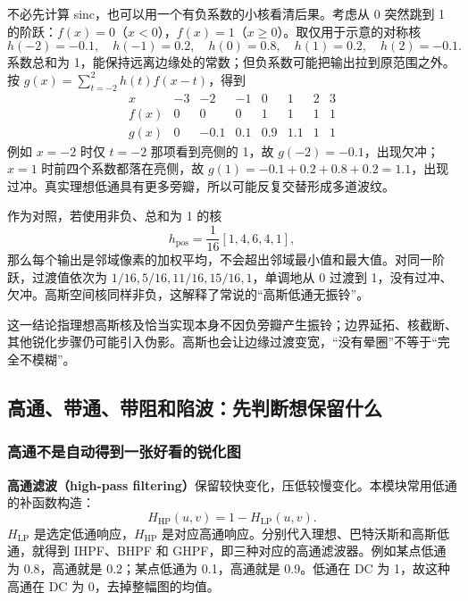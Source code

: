 不必先计算 sinc，也可以用一个有负系数的小核看清后果。考虑从 0 突然跳到 1 的阶跃：$f(x)=0$（$x<0$），$f(x)=1$（$x\geq0$）。取仅用于示意的对称核
\[
h(-2)=-0.1,\quad h(-1)=0.2,\quad h(0)=0.8,
\quad h(1)=0.2,\quad h(2)=-0.1.
\]
系数总和为 1，能保持远离边缘处的常数；但负系数可能把输出拉到原范围之外。按 $g(x)=\sum_{t=-2}^{2}h(t)f(x-t)$，得到
\[
\begin{array}{c|rrrrrrr}
x&-3&-2&-1&0&1&2&3\\\hline
f(x)&0&0&0&1&1&1&1\\
g(x)&0&-0.1&0.1&0.9&1.1&1&1
\end{array}
\]
例如 $x=-2$ 时仅 $t=-2$ 那项看到亮侧的 1，故 $g(-2)=-0.1$，出现欠冲；$x=1$ 时前四个系数都落在亮侧，故 $g(1)=-0.1+0.2+0.8+0.2=1.1$，出现过冲。真实理想低通具有更多旁瓣，所以可能反复交替形成多道波纹。

\begin{center}
\end{center}

作为对照，若使用非负、总和为 1 的核
\[
h_{\mathrm{pos}}=\frac1{16}[1,4,6,4,1],
\]
那么每个输出是邻域像素的加权平均，不会超出邻域最小值和最大值。对同一阶跃，过渡值依次为 $1/16,5/16,11/16,15/16,1$，单调地从 0 过渡到 1，没有过冲、欠冲。高斯空间核同样非负，这解释了常说的“高斯低通无振铃”。

这一结论指理想高斯核及恰当实现本身不因负旁瓣产生振铃；边界延拓、核截断、其他锐化步骤仍可能引入伪影。高斯也会让边缘过渡变宽，“没有晕圈”不等于“完全不模糊”。

\subsection{高通、带通、带阻和陷波：先判断想保留什么}

\subsubsection{高通不是自动得到一张好看的锐化图}
\textbf{高通滤波（high-pass filtering）}保留较快变化，压低较慢变化。本模块常用低通的补函数构造：
\[
H_{\mathrm{HP}}(u,v)=1-H_{\mathrm{LP}}(u,v).
\]
$H_{\mathrm{LP}}$ 是选定低通响应，$H_{\mathrm{HP}}$ 是对应高通响应。分别代入理想、巴特沃斯和高斯低通，就得到 IHPF、BHPF 和 GHPF，即三种对应的高通滤波器。例如某点低通为 0.8，高通就是 0.2；某点低通为 0.1，高通就是 0.9。低通在 DC 为 1，故这种高通在 DC 为 0，去掉整幅图的均值。

